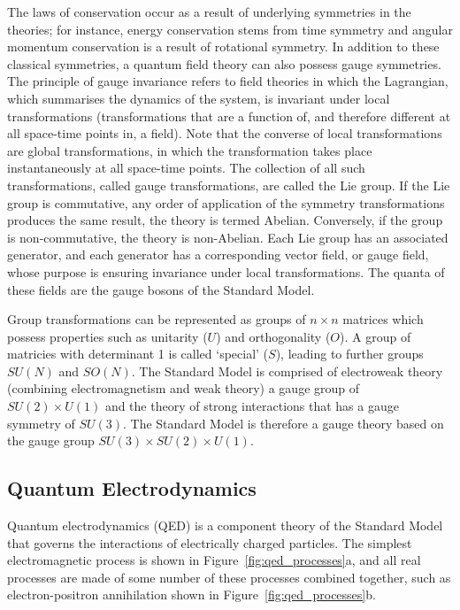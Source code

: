 The laws of conservation occur as a result of underlying symmetries in the theories; for instance, energy
conservation stems from time symmetry and angular momentum conservation is a result of rotational symmetry.
In addition to these classical symmetries, a quantum field theory can also possess gauge symmetries. The
principle of gauge invariance refers to field theories in which the Lagrangian, which summarises the dynamics
of the system, is invariant under local transformations (transformations that are a function of, and therefore
different at all space-time points in, a field). Note that the converse of local transformations are global
transformations, in which the transformation takes place instantaneously at all space-time points. The
collection of all such transformations, called gauge transformations, are called the Lie group. If the Lie
group is commutative, \ie any order of application of the symmetry transformations produces the same result,
the theory is termed Abelian. Conversely, if the group is non-commutative, the theory is non-Abelian. Each Lie
group has an associated generator, and each generator has a corresponding vector field, or gauge field, whose
purpose is ensuring invariance under local transformations. The quanta of these fields are the gauge bosons of
the Standard Model.

Group transformations can be represented as groups of $n \times n$ matrices which possess properties such as
unitarity ($U$) and orthogonality ($O$). A group of matricies with determinant 1 is called `special' ($S$),
leading to further groups $SU(N)$ and $SO(N)$. The Standard Model is comprised of electroweak theory
(combining electromagnetism and weak theory) a gauge group of $SU(2) \times U(1)$ and the theory of strong
interactions that has a gauge symmetry of $SU(3)$. The Standard Model is therefore a gauge theory based on the
gauge group $SU(3) \times SU(2) \times U(1)$.

\subsection{Quantum Electrodynamics}
\label{ss:quantum_electrodynamics}

Quantum electrodynamics (QED) is a component theory of the Standard Model that governs the interactions of
electrically charged particles. The simplest electromagnetic process is shown in
Figure~\ref{fig:qed_processes}a, and all real processes are made of some number of these processes combined
together, such as electron-positron annihilation shown in Figure~\ref{fig:qed_processes}b.

